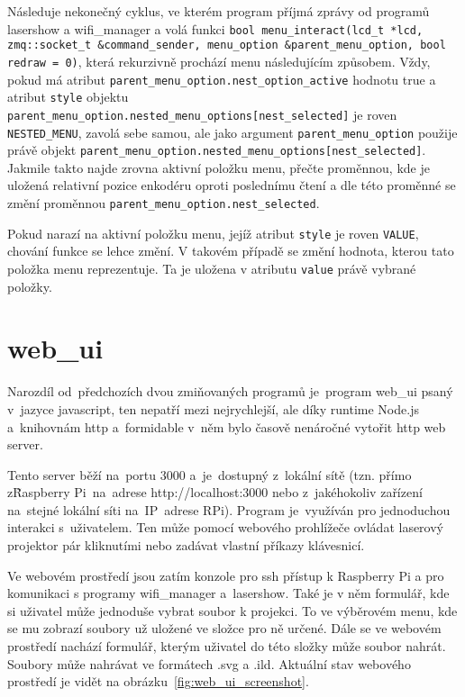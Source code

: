 Následuje nekonečný cyklus, ve kterém program příjmá zprávy od programů lasershow a wifi\_manager a volá funkci \texttt{bool menu_interact(lcd_t *lcd, zmq::socket_t &command_sender, menu_option &parent_menu_option, bool redraw = 0)}, která rekurzivně prochází menu následujícím způsobem.
Vždy, pokud má atribut \texttt{parent_menu_option.nest_option_active} hodnotu true a atribut \texttt{style} objektu \texttt{parent_menu_option.nested_menu_options[nest_selected]} je roven \texttt{NESTED_MENU}, zavolá sebe samou, ale jako argument \texttt{parent_menu_option} použije právě objekt \texttt{parent_menu_option.nested_menu_options[nest_selected]}.
Jakmile takto najde zrovna aktivní položku menu, přečte proměnnou, kde je uložená relativní pozice enkodéru oproti poslednímu čtení a dle této proměnné se změní proměnnou \texttt{parent_menu_option.nest_selected}.

Pokud narazí na aktivní položku menu, jejíž atribut \texttt{style} je roven \texttt{VALUE}, chování funkce se lehce změní. V takovém případě se změní hodnota, kterou tato položka menu reprezentuje. Ta je uložena v atributu \texttt{value} právě vybrané položky.

\section{web\_ui}

Narozdíl od~předchozích dvou zmiňovaných programů je~program web\_ui psaný v~jazyce javascript, ten nepatří mezi nejrychlejší, ale díky runtime Node.js a~knihovnám http a~formidable v~něm bylo časově nenáročné vytořit http web server.

Tento server běží na~portu 3000 a~je~dostupný z~lokální sítě (tzn. přímo z\~Raspberry Pi~na~adrese http://localhost:3000 nebo z~jakéhokoliv zařízení na~stejné lokální síti na~IP~adrese RPi).
Program je~využíván pro jednoduchou interakci s~uživatelem.
Ten může pomocí webového prohlížeče ovládat laserový projektor pár kliknutími nebo zadávat vlastní příkazy klávesnicí.

Ve webovém prostředí jsou zatím konzole pro ssh přístup k Raspberry Pi a pro komunikaci s programy wifi\_manager a~lasershow.
Také je v něm formulář, kde si uživatel může jednoduše vybrat soubor k projekci.
To ve výběrovém menu, kde se mu zobrazí soubory už uložené ve složce pro ně určené. Dále se ve webovém prostředí nachází formulář, kterým uživatel do této složky může soubor nahrát. Soubory může nahrávat ve formátech .svg a .ild.
Aktuální stav webového prostředí je vidět na obrázku~\ref{fig:web_ui_screenshot}.

